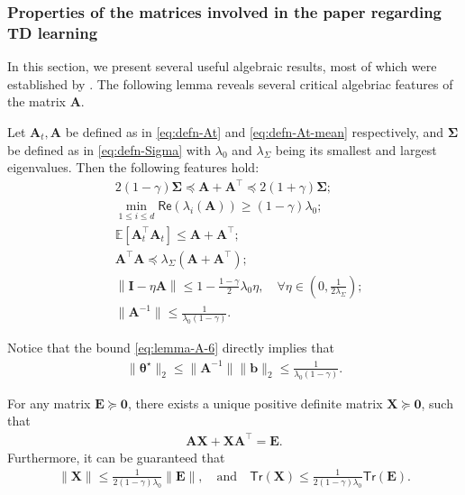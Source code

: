 \subsubsection{Properties of the matrices involved in the paper regarding TD learning}
In this section, we present several useful algebraic results, most of which were established by \cite{wu2024statistical}.
The following lemma reveals several critical algebriac features of the matrix $\bm{A}$.
\begin{customlemma}\label{lemma:A}
Let $\bm{A}_t,\bm{A}$ be defined as in \eqref{eq:defn-At} and \eqref{eq:defn-At-mean} respectively, and $\bm{\Sigma}$ be defined as in \eqref{eq:defn-Sigma} with $\lambda_0$ and $\lambda_{\Sigma}$ being its smallest and largest eigenvalues. Then the following features hold:
\begin{align}
&2(1-\gamma) \bm{\Sigma} \preceq \bm{A} + \bm{A}^\top \preceq 2(1+\gamma) \bm{\Sigma}; \label{eq:lemma-A-1} \\ 
&\min_{1 \leq i \leq d} \mathsf{Re}(\lambda_i(\bm{A})) \geq (1-\gamma) \lambda_0; \label{eq:lemma-A-2}\\ 
&\mathbb{E}[\bm{A}_t^\top \bm{A}_t] \leq \bm{A} + \bm{A}^\top; \label{eq:lemma-A-3}\\ 
&\bm{A}^\top \bm{A} \preceq \lambda_{\Sigma}(\bm{A} + \bm{A}^\top); \label{eq:lemma-A-4}\\
&\left\|\bm{I}-\eta \bm{A}\right\| \leq 1-\frac{1-\gamma}{2}\lambda_0 \eta, \quad  \forall \eta \in \left(0,\frac{1}{2\lambda_{\Sigma}}\right); \label{eq:lemma-A-5}\\
&\|\bm{A}^{-1}\| \leq \frac{1}{\lambda_0(1-\gamma)}.\label{eq:lemma-A-6}
\end{align}
\end{customlemma}
Notice that the bound \eqref{eq:lemma-A-6} directly implies that
\begin{align}\label{eq:theta-norm-bound}
\|\bm{\theta}^\star\|_2 \leq \|\bm{A}^{-1}\|\|\bm{b}\|_2 \leq \frac{1}{\lambda_0(1-\gamma)}.
\end{align}

\begin{customlemma}\label{lemma:Lyapunov}
For any matrix $\bm{E} \succeq \bm{0}$, there exists a unique positive definite matrix $\bm{X} \succeq \bm{0}$, such that
\begin{align*}
\bm{AX} + \bm{XA}^\top  = \bm{E}.
\end{align*}
Furthermore, it can be guaranteed that
\begin{align*}
\|\bm{X}\| \leq \frac{1}{2(1-\gamma)\lambda_0} \|\bm{E}\|, \quad \text{and} \quad \mathsf{Tr}(\bm{X}) \leq \frac{1}{2(1-\gamma)\lambda_0} \mathsf{Tr}(\bm{E}).
\end{align*}
\end{customlemma}


